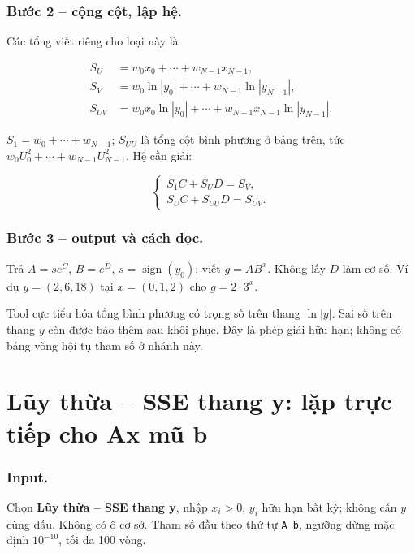 \subsubsection*{Bước 2 -- cộng cột, lập hệ.} Các tổng viết riêng cho loại này là

\begin{align*}S_U&=w_0x_0+\cdots+w_{N-1}x_{N-1},\\S_V&=w_0\ln|y_0|+\cdots+w_{N-1}\ln|y_{N-1}|,\\S_{UV}&=w_0x_0\ln|y_0|+\cdots+w_{N-1}x_{N-1}\ln|y_{N-1}|.\end{align*}

$S_1=w_0+\cdots+w_{N-1}$; $S_{UU}$ là tổng cột bình phương ở bảng trên, tức $w_0U_0^2+\cdots+w_{N-1}U_{N-1}^2$. Hệ cần giải:

\[\boxed{\begin{cases}S_1C+S_UD=S_V,\\S_UC+S_{UU}D=S_{UV}.\end{cases}}\]

\subsubsection*{Bước 3 -- output và cách đọc.} Trả $A=se^C$, $B=e^D$, $s=\operatorname{sign}(y_0)$; viết $g=AB^x$. Không lấy $D$ làm cơ số. Ví dụ $y=(2,6,18)$ tại $x=(0,1,2)$ cho $g=2\cdot3^x$.

Tool cực tiểu hóa tổng bình phương có trọng số trên thang $\ln|y|$. Sai số trên thang $y$ còn được báo thêm sau khôi phục. Đây là phép giải hữu hạn; không có bảng vòng hội tụ tham số ở nhánh này.


\examplebreak
\section{Lũy thừa -- SSE thang y: lặp trực tiếp cho Ax mũ b}
\label{sec:ls-power-raw}
\subsubsection*{Input.} Chọn \textbf{Lũy thừa -- SSE thang y}, nhập $x_i>0$, $y_i$ hữu hạn bất kỳ; không cần $y$ cùng dấu. Không có ô cơ sở. Tham số đầu theo thứ tự \texttt{A b}, ngưỡng dừng mặc định $10^{-10}$, tối đa 100 vòng.
